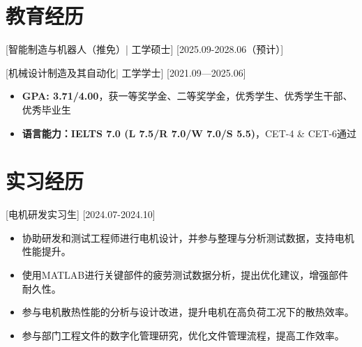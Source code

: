 \documentclass{resume}
\begin{document}


\ResumeTitle


\section{教育经历}

[\textnormal{智能制造与机器人（推免）|} 工学硕士]
[2025.09-2028.06（预计）]

[\textnormal{机械设计制造及其自动化|} 工学学士]
[2021.09—2025.06]
\begin{itemize}
  \item \textbf{GPA: 3.71/4.00}，获一等奖学金、二等奖学金，优秀学生、优秀学生干部、优秀毕业生
  \item \textbf{语言能力：IELTS 7.0 (L 7.5/R 7.0/W 7.0/S 5.5)}，CET-4 \& CET-6通过
\end{itemize}


\section{实习经历}

[电机研发实习生]
[2024.07-2024.10] 

\begin{itemize}
  \item 协助研发和测试工程师进行电机设计，并参与整理与分析测试数据，支持电机性能提升。
  \item 使用MATLAB进行关键部件的疲劳测试数据分析，提出优化建议，增强部件耐久性。
  \item 参与电机散热性能的分析与设计改进，提升电机在高负荷工况下的散热效率。
  \item 参与部门工程文件的数字化管理研究，优化文件管理流程，提高工作效率。
\end{itemize}
\end{document}

